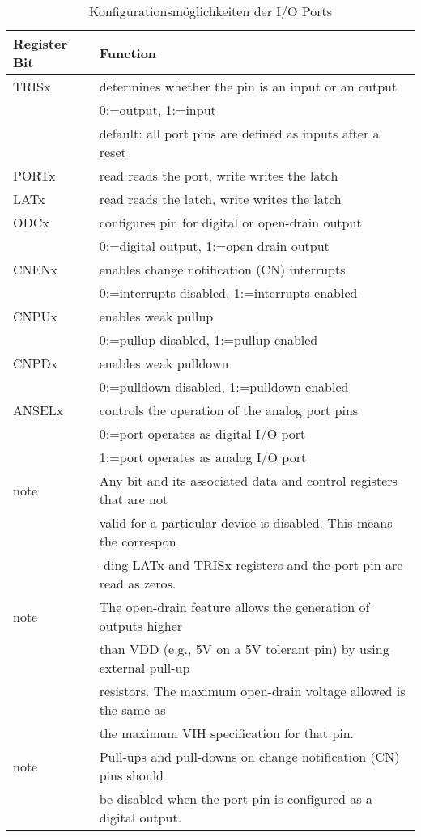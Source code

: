 \newpage
\begin{table}
\begin{tabular}{|l|l|}
	\hline 
	\textbf{Register Bit} & \textbf{Function}\\ 
	\hline
	TRISx 	&determines whether the pin is an input 	or an output\\
			&0:=output, 1:=input\\
			&default: all port pins are defined as inputs after a reset\\
	\hline 
	PORTx 	&read reads the port, write writes the latch \\ 
	\hline 
	LATx 	&read reads the latch, write writes the latch \\ 
	\hline 
	ODCx 	&configures pin for digital or open-drain output \\
			&0:=digital output, 1:=open drain output\\
	\hline 
	CNENx 	&enables change notification (CN) interrupts\\
			&0:=interrupts disabled, 1:=interrupts enabled\\
	\hline 
	CNPUx 	&enables weak pullup\\
			&0:=pullup disabled, 1:=pullup enabled\\  
	\hline 
	CNPDx 	&enables weak pulldown\\
			&0:=pulldown disabled, 1:=pulldown enabled\\  
	\hline 
	ANSELx 	&controls the operation of the analog port pins\\
			&0:=port operates as digital I/O port\\
			&1:=port operates as analog I/O port\\
	\hline
	note 	&Any bit and its associated data and control registers that are not\\
			&valid for a particular device is disabled. This means the correspon\\
			&-ding LATx and TRISx registers and the port pin are read as zeros.\\
	\hline
	note	&The open-drain feature allows the generation of outputs higher\\
			&than VDD (e.g., 5V on a 5V tolerant pin) by using external pull-up\\
			&resistors. The maximum open-drain voltage allowed is the same as \\
			&the maximum VIH specification for that pin.\\
	\hline
	note	&Pull-ups and pull-downs on change notification (CN) pins should\\
			&be disabled when the port pin is configured as a digital output.\\
	\hline
\end{tabular}
\caption{Konfigurationsmöglichkeiten der I/O Ports}
\label{tab:ioports}
\end{table}

